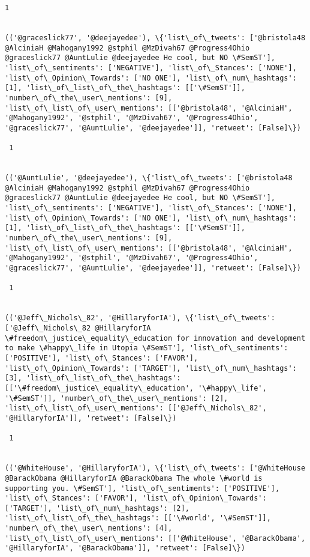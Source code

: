 \documentclass[11pt]{article}
\begin{document}
\begin{Verbatim}[commandchars=\\\{\}]
 1
 

(('@graceslick77', '@deejayedee'), \{'list\_of\_tweets': ['@bristola48 @AlciniaH @Mahogany1992 @stphil @MzDivah67 @Progress4Ohio @graceslick77 @AuntLulie @deejayedee He cool, but NO \#SemST'], 'list\_of\_sentiments': ['NEGATIVE'], 'list\_of\_Stances': ['NONE'], 'list\_of\_Opinion\_Towards': ['NO ONE'], 'list\_of\_num\_hashtags': [1], 'list\_of\_list\_of\_the\_hashtags': [['\#SemST']], 'number\_of\_the\_user\_mentions': [9], 'list\_of\_list\_of\_user\_mentions': [['@bristola48', '@AlciniaH', '@Mahogany1992', '@stphil', '@MzDivah67', '@Progress4Ohio', '@graceslick77', '@AuntLulie', '@deejayedee']], 'retweet': [False]\})

 1
 

(('@AuntLulie', '@deejayedee'), \{'list\_of\_tweets': ['@bristola48 @AlciniaH @Mahogany1992 @stphil @MzDivah67 @Progress4Ohio @graceslick77 @AuntLulie @deejayedee He cool, but NO \#SemST'], 'list\_of\_sentiments': ['NEGATIVE'], 'list\_of\_Stances': ['NONE'], 'list\_of\_Opinion\_Towards': ['NO ONE'], 'list\_of\_num\_hashtags': [1], 'list\_of\_list\_of\_the\_hashtags': [['\#SemST']], 'number\_of\_the\_user\_mentions': [9], 'list\_of\_list\_of\_user\_mentions': [['@bristola48', '@AlciniaH', '@Mahogany1992', '@stphil', '@MzDivah67', '@Progress4Ohio', '@graceslick77', '@AuntLulie', '@deejayedee']], 'retweet': [False]\})

 1
 

(('@Jeff\_Nichols\_82', '@HillaryforIA'), \{'list\_of\_tweets': ['@Jeff\_Nichols\_82 @HillaryforIA \#freedom\_justice\_equality\_education for innovation and development to make \#happy\_life in Utopia \#SemST'], 'list\_of\_sentiments': ['POSITIVE'], 'list\_of\_Stances': ['FAVOR'], 'list\_of\_Opinion\_Towards': ['TARGET'], 'list\_of\_num\_hashtags': [3], 'list\_of\_list\_of\_the\_hashtags': [['\#freedom\_justice\_equality\_education', '\#happy\_life', '\#SemST']], 'number\_of\_the\_user\_mentions': [2], 'list\_of\_list\_of\_user\_mentions': [['@Jeff\_Nichols\_82', '@HillaryforIA']], 'retweet': [False]\})

 1
 

(('@WhiteHouse', '@HillaryforIA'), \{'list\_of\_tweets': ['@WhiteHouse @BarackObama @HillaryforIA @BarackObama The whole \#world is supporting you. \#SemST'], 'list\_of\_sentiments': ['POSITIVE'], 'list\_of\_Stances': ['FAVOR'], 'list\_of\_Opinion\_Towards': ['TARGET'], 'list\_of\_num\_hashtags': [2], 'list\_of\_list\_of\_the\_hashtags': [['\#world', '\#SemST']], 'number\_of\_the\_user\_mentions': [4], 'list\_of\_list\_of\_user\_mentions': [['@WhiteHouse', '@BarackObama', '@HillaryforIA', '@BarackObama']], 'retweet': [False]\})


\end{Verbatim}
\end{document}
